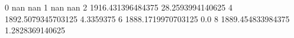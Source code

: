 0 nan nan
1 nan nan
2 1916.431396484375 28.2593994140625
4 1892.5079345703125 4.3359375
6 1888.1719970703125 0.0
8 1889.454833984375 1.2828369140625
